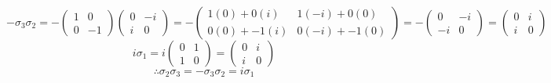 \begin{itemize}
\begin{itemize}
\[-\sigma_3\sigma_2=- \begin{pmatrix} 1 & 0\\ 0 & -1
\end{pmatrix} \begin{pmatrix} 0 & -i \\ i & 0\end{pmatrix}= -\begin{pmatrix} 1(0)+0(i) & 1(-i)+0(0)\\ 0(0)+-1(i) & 0(-i)+-1(0)\end{pmatrix}=-\begin{pmatrix} 0 & -i \\ -i & 0 \end{pmatrix}=\begin{pmatrix} 0 & i \\ i & 0 \end{pmatrix}\]
\[i\sigma_1 =i \begin{pmatrix} 0 & 1 \\ 1 & 0 \end{pmatrix}=\begin{pmatrix} 0 & i \\ i & 0 \end{pmatrix}\]
\[\therefore \sigma_2\sigma_3=-\sigma_3\sigma_2=i\sigma_1\]
\end{itemize}
\end{itemize}


